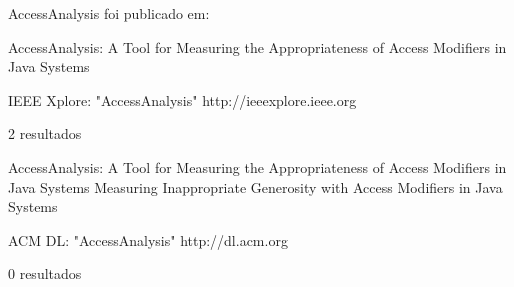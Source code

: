 AccessAnalysis foi publicado em:

AccessAnalysis: A Tool for Measuring the Appropriateness of Access Modifiers in Java Systems

IEEE Xplore: "AccessAnalysis"
http://ieeexplore.ieee.org

2 resultados

AccessAnalysis: A Tool for Measuring the Appropriateness of Access Modifiers in Java Systems
Measuring Inappropriate Generosity with Access Modifiers in Java Systems

ACM DL: "AccessAnalysis"
http://dl.acm.org

0 resultados
